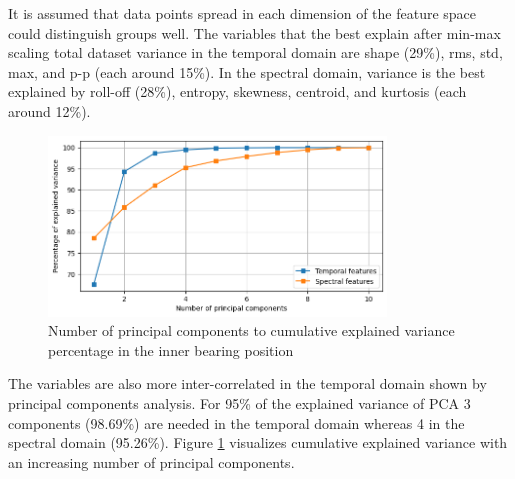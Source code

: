 It is assumed that data points spread in each dimension of the feature space could distinguish groups well. The variables that the best explain after min-max scaling total dataset variance in the temporal domain are shape (29\%), rms, std, max, and p-p (each around 15\%). In the spectral domain, variance is the best explained by roll-off (28\%), entropy, skewness, centroid, and kurtosis (each around 12\%).
\begin{figure}[h!]
    \centering
    \includegraphics[width=0.8\textwidth]{assets/design/pca-explained-variance.png}
    \caption{Number of principal components to cumulative explained variance percentage in the inner bearing position}
    \label{fig:design:pca-explained-variance} 
\end{figure}

The variables are also more inter-correlated in the temporal domain shown by principal components analysis. For 95\% of the explained variance of PCA 3 components (98.69\%) are needed in the temporal domain whereas 4 in the spectral domain (95.26\%). Figure \ref{fig:design:pca-explained-variance} visualizes cumulative explained variance with an increasing number of principal components. 

